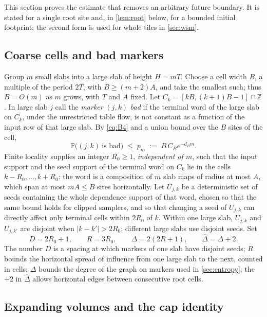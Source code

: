 \documentclass[11pt]{article}
\theoremstyle{plain}
\theoremstyle{definition}
\theoremstyle{remark}
\newcommand{\Z}{\mathbb{Z}}
\newcommand{\Prob}{\mathbb{P}}
\newcommand{\hatD}{\widehat{\Delta}}
\begin{document}
This section proves the estimate that removes an arbitrary future boundary. It is stated for a single root site and, in \cref{lem:root} below, for a bounded initial footprint; the second form is used for whole tiles in \cref{sec:wsm}.

\subsection{Coarse cells and bad markers}
\label{sec:cells}

Group $m$ small slabs into a large slab of height $H=mT$. Choose a cell width $B$, a multiple of the period $2T$, with $B\ge(m+2)A$, and take the smallest such; thus $B=O(m)$ as $m$ grows, with $T$ and $A$ fixed. Let $C_k=[kB,(k+1)B-1]\cap\Z$. In large slab $j$ call the \emph{marker} $(j,k)$ \emph{bad} if the terminal word of the large slab on $C_k$, under the unrestricted table flow, is not constant as a function of the input row of that large slab. By \eqref{eq:B4} and a union bound over the $B$ sites of the cell,
\begin{equation}
\Prob\bigl((j,k)\ \text{is bad}\bigr)\;\le\;p_m\;:=\;B\,C_Be^{-d_Bm}.
\label{eq:pm}
\end{equation}
Finite locality supplies an integer $R_0\ge1$, \emph{independent of $m$}, such that the input support and the seed support of the terminal word on $C_k$ lie in the cells $k-R_0,\dots,k+R_0$: the word is a composition of $m$ slab maps of radius at most $A$, which span at most $mA\le B$ sites horizontally. Let $U_{j,k}$ be a deterministic set of seeds containing the whole dependence support of that word, chosen so that the same bound holds for clipped samplers, and so that changing a seed of $U_{j,k}$ can directly affect only terminal cells within $2R_0$ of $k$. Within one large slab, $U_{j,k}$ and $U_{j,k'}$ are disjoint when $|k-k'|>2R_0$; different large slabs use disjoint seeds. Set
\begin{equation}
D=2R_0+1,\qquad R=3R_0,\qquad \Delta=2(2R+1),\qquad \hatD=\Delta+2.
\label{eq:constants}
\end{equation}
The number $D$ is a spacing at which markers of one slab have disjoint seeds; $R$ bounds the horizontal spread of influence from one large slab to the next, counted in cells; $\Delta$ bounds the degree of the graph on markers used in \cref{sec:entropy}; the $+2$ in $\hatD$ allows horizontal edges between consecutive root cells.

\subsection{Expanding volumes and the cap identity}
\label{sec:capidentity}
\end{document}
